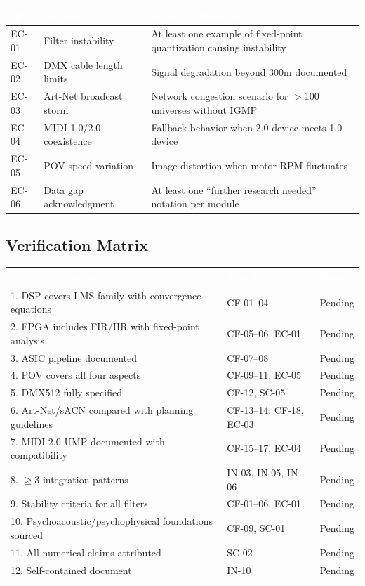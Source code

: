 \documentclass[11pt,letterpaper]{article}
\newcommand{\tableheader}[1]{\textbf{\sffamily\textcolor{white}{#1}}}
\begin{document}
\begin{center}
\begin{tabularx}{\textwidth}{C{1.2cm}L{3.5cm}X}
\toprule
{}
\tableheader{ID} & \tableheader{Verifies} & \tableheader{Expected Behavior} \\
\midrule
EC-01 & Filter instability & At least one example of fixed-point quantization causing instability \\
EC-02 & DMX cable length limits & Signal degradation beyond 300m documented \\
EC-03 & Art-Net broadcast storm & Network congestion scenario for $>$100 universes without IGMP \\
EC-04 & MIDI 1.0/2.0 coexistence & Fallback behavior when 2.0 device meets 1.0 device \\
EC-05 & POV speed variation & Image distortion when motor RPM fluctuates \\
EC-06 & Data gap acknowledgment & At least one ``further research needed'' notation per module \\
\bottomrule
\end{tabularx}
\end{center}

\subsection{Verification Matrix}

\begin{center}
\begin{tabularx}{\textwidth}{XL{3cm}C{1.5cm}}
\toprule
{}
\tableheader{Success Criterion} & \tableheader{Test ID(s)} & \tableheader{Status} \\
. DSP covers LMS family with convergence equations & CF-01--04 & Pending \\
2. FPGA includes FIR/IIR with fixed-point analysis & CF-05--06, EC-01 & Pending \\
3. ASIC pipeline documented & CF-07--08 & Pending \\
4. POV covers all four aspects & CF-09--11, EC-05 & Pending \\
5. DMX512 fully specified & CF-12, SC-05 & Pending \\
6. Art-Net/sACN compared with planning guidelines & CF-13--14, CF-18, EC-03 & Pending \\
7. MIDI 2.0 UMP documented with compatibility & CF-15--17, EC-04 & Pending \\
8. $\geq$3 integration patterns & IN-03, IN-05, IN-06 & Pending \\
9. Stability criteria for all filters & CF-01--06, EC-01 & Pending \\
10. Psychoacoustic/psychophysical foundations sourced & CF-09, SC-01 & Pending \\
11. All numerical claims attributed & SC-02 & Pending \\
12. Self-contained document & IN-10 & Pending \\
\bottomrule
\end{tabularx}
\end{center}
\end{document}
